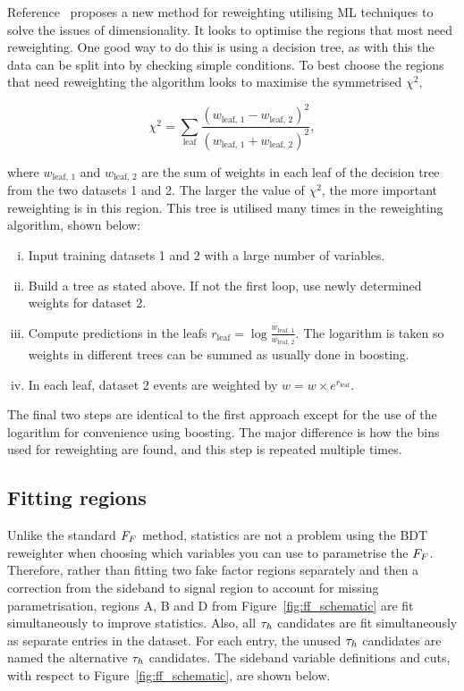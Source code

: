 Reference~\cite{Rogozhnikov:2016bdp} proposes a new method for reweighting utilising \ac{ML} techniques to solve the issues of dimensionality. 
It looks to optimise the regions that most need reweighting. 
One good way to do this is using a decision tree, as with this the data can be split into  by checking simple conditions.
To best choose the regions that need reweighting the algorithm looks to maximise the symmetrised $\chi^2$,

\begin{equation}
\chi^2 = \sum_{\text{leaf}} \frac{(w_{\text{leaf, 1}}-w_{\text{leaf, 2}})^2}{(w_{\text{leaf, 1}}+w_{\text{leaf, 2}})^2},
\end{equation}

where $w_{\text{leaf, 1}}$ and $w_{\text{leaf, 2}}$ are the sum of weights in each leaf of the decision tree from the two datasets 1 and 2.
The larger the value of $\chi^2$, the more important reweighting is in this region. 
This tree is utilised many times in the reweighting algorithm, shown below:

\begin{enumerate}[i)]
\item Input training datasets 1 and 2 with a large number of variables.
\item Build a tree as stated above. If not the first loop, use newly determined weights for dataset 2.
\item Compute predictions in the leafs $r_{\text{leaf}} = \log\frac{w_{\text{leaf, 1}}}{w_{\text{leaf, 2}}}$. The logarithm is taken so weights in different trees can be summed as usually done in boosting.
\item In each leaf, dataset 2 events are weighted by $w = w \times e^{r_{\text{leaf}}}$.
\end{enumerate}

The final two steps are identical to the first approach except for the use of the logarithm for convenience using boosting. 
The major difference is how the bins used for reweighting are found, and this step is repeated multiple times. \\

\subsection{Fitting regions}

Unlike the standard $F_{F}$ method, statistics are not a problem using the \ac{BDT} reweighter when choosing which variables you can use to parametrise the $F_{F}$. 
Therefore, rather than fitting two fake factor regions separately and then a correction from the sideband to signal region to account for missing parametrisation, regions A, B and D from Figure~\ref{fig:ff_schematic} are fit simultaneously to improve statistics. 
Also, all $\tau_{h}$ candidates are fit simultaneously as separate entries in the dataset. 
For each entry, the unused $\tau_{h}$ candidates are named the alternative $\tau_{h}$ candidates. 
The sideband variable definitions and cuts, with respect to Figure~\ref{fig:ff_schematic}, are shown below. 

